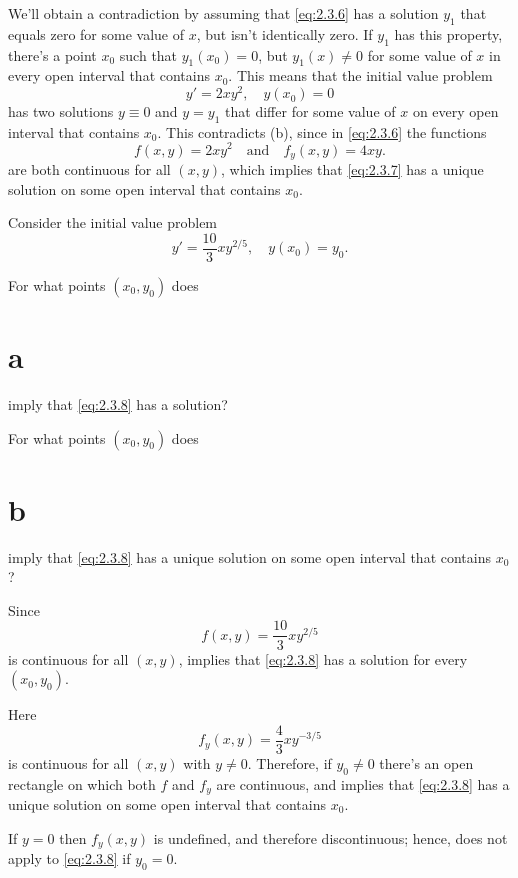 \begin{solution}
We'll obtain a contradiction
by assuming that \eqref{eq:2.3.6} has a solution $y_1$ that equals
zero for some value of $x$, but isn't  identically zero. If $y_1$
has this property,  there's a point $x_0$ such that $y_1(x_0)=0$,
but $y_1(x)\ne0$ for some value of $x$ in every open interval that contains
$x_0$. This means that the initial value problem
\begin{equation} \label{eq:2.3.7}
y'=2xy^2,\quad y(x_0)=0
\end{equation}
has two solutions $y\equiv0$ and $y=y_1$ that differ for some value of
$x$ on every open interval that contains $x_0$. This contradicts
(b), since in \eqref{eq:2.3.6} the functions
\[
f(x,y)=2xy^2 \quad\text{and}\quad  f_y(x,y)= 4xy.
\]
are both continuous
for all $(x,y)$, which implies that \eqref{eq:2.3.7} has a unique
solution on some open interval that contains $x_0$.
\end{solution}

\begin{example}\label{example:2.3.5}
Consider the initial value problem
\begin{equation} \label{eq:2.3.8}
y' = \frac{10}{3}xy^{2/5}, \quad y(x_0) = y_0.
\end{equation}
\begin{alist}
\item %
For what points $(x_0,y_0)$ does \part{a}
imply that
\eqref{eq:2.3.8} has a solution?

\item %
For what points $(x_0,y_0)$ does \part{b}
imply that
\eqref{eq:2.3.8} has a  unique solution on some open interval that contains
$x_0$?
\end{alist}
\end{example}

\begin{alistSolution}
\item Since
\[
f(x,y) = \frac{10}{3}xy^{2/5}
\]
is continuous for all $(x,y)$,  
implies that \eqref{eq:2.3.8} has a solution for every $(x_0,y_0)$.

\item Here
\[
f_y(x,y) = \frac{4 }{3}xy^{-3/5}
\]
is continuous for all $(x,y)$ with $y\ne 0$. Therefore, if $y_0\ne0$
there's an open rectangle on which both $f$ and $f_y$ are
continuous, and  implies that \eqref{eq:2.3.8} has
a unique solution on some open interval that contains $x_0$.

If $y=0$ then $f_y(x,y)$ is undefined, and therefore discontinuous;
hence,  does not apply to \eqref{eq:2.3.8} if
$y_0=0$.
\end{alistSolution}

